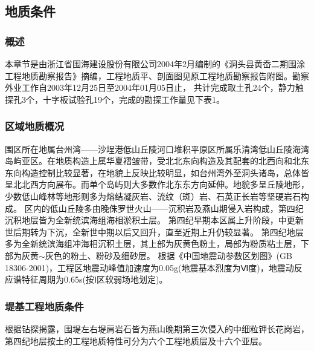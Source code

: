 \documentclass[UTF8, a4paper, 12pt]{ctexart} %
\begin{document}
\subsection{地质条件}
\subsubsection{概述}
本章节是由浙江省围海建设股份有限公司2004年2月编制的《洞头县黄岙二期围涂工程地质勘察报告》摘编，工程地质平、剖面图见原工程地质勘察报告附图。勘察外业工作自2003年12月25日至2004年01月05日止，
共计完成取土孔24个，静力触探孔3个，十字板试验孔19个，完成的勘探工作量见下表1。
\begin{table}[h]
    \centering
    \caption{堤线勘探工作量统计表}
    \label{tab:exploration_statistics}
\end{table}

\subsubsection{区域地质概况}
围区所在地属台州湾——沙埕港低山丘陵河口堆积平原区所属乐清湾低山丘陵海湾岛屿亚区。在地质构造上属华夏褶皱带，受北北东向构造及其配套的北西向和北东东向构造控制比较显著，在地貌上反映比较明显，如台州湾外至洞头诸岛，总体皆呈北北西方向展布。而单个岛屿则大多数作北东东方向延伸。地貌多呈丘陵地形，少数低山峰林等地形则多为熔结凝灰岩、流纹（斑）岩、石英正长岩等坚硬岩石构成。
区内的低山丘陵多由晚侏罗世火山——沉积岩及燕山期侵入岩构成，第四纪沉积地层皆为全新统滨海组海相淤积土层。
第四纪早期本区属上升阶段，中更新世后期转为下沉，全新世中期以后又回升，直至近期上升仍较显著。
第四纪地层多为全新统滨海组冲海相沉积土层，其上部为灰黄色粉土，局部为粉质粘土层，下部为灰黄$\sim$灰色的粉土、粉砂及细砂层。
根据《中国地震动参数区划图》(GB 18306-2001)，工程区地震动峰值加速度为0.05g(地震基本烈度为Ⅵ度)，地震动反应谱特征周期为0.65s(按Ⅰ区软弱场地划定)。
\subsubsection{堤基工程地质条件}
根据钻探揭露，围堤左右堤肩岩石皆为燕山晚期第三次侵入的中细粒钾长花岗岩，第四纪地层按土的工程地质特性可分为六个工程地质层及十六个亚层。
\end{document}
